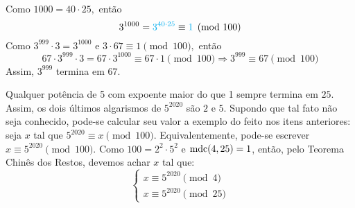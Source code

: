 \documentclass[12pt, a4paper]{article}
\newcommand{\mdc}{{\rm mdc}}
\newcommand{\negrito}[1]{\mbox{\boldmath{$#1$}}}
\newcommand{\alt}[1]{\textcolor{Floresta}{$\negrito{(#1)} $}}
\begin{document}
\begin{solution}
{    Como $1000 = 40 \cdot 25,$ então
\[ 3^{1000} = \textcolor{Cyan}{3^{40 \cdot 25}} \equiv \textcolor{Cyan}{1} \pmod{100}\]
Como $3^{999} \cdot 3 = 3^{1000}$ e $3 \cdot 67 \equiv 1 \pmod{100},$ então
\[
67 \cdot 3^{999} \cdot 3 = 67 \cdot 3^{1000} \equiv 67 \cdot 1\pmod{100} \Rightarrow 3^{999} \equiv 67 \pmod{100} 
\]
 Assim, $3^{999}$ termina em $67$.
 
 \task[\alt{c}] Qualquer potência de 5 com expoente maior do que 1 sempre termina em $25$. Assim, os dois últimos algarismos de $5^{2020}$ são $2$ e $5.$ Supondo que tal fato não seja conhecido, pode-se calcular seu valor a exemplo do feito nos itens anteriores: seja $x$ tal que $5^{2020} \equiv x \pmod{100}.$ Equivalentemente, pode-se escrever $x \equiv 5^{2020} \pmod{100}.$ 
 Como $100=2^2\cdot5^2$ e $\mdc(4,25)=1$, então, pelo Teorema Chinês dos Restos, devemos achar $x$ tal que:
    $$\left\{\begin{array}{l}
    x\equiv 5^{2020} \pmod 4\\
    x\equiv 5^{2020} \pmod{25}
    \end{array}\right.$$
    
}
\end{solution}
\end{document}
